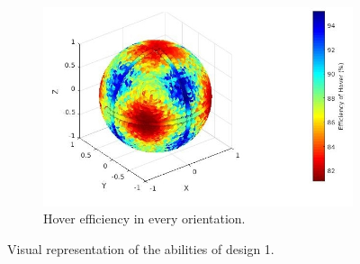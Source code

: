 \begin{figure}[!ht]
\begin{center}
{\begin{subfigure}[b]{0.52\textwidth}
    \includegraphics[width=\linewidth]{images/Quad_design_2_hspace.jpg}
    \caption{Hover efficiency in every orientation.} \label{fig:deisgn1_hspace}
  \end{subfigure}}
  \caption{Visual representation of the abilities of design 1.}
  \label{fig:Quadcopter1_spaces}
  \end{center}
\end{figure}


